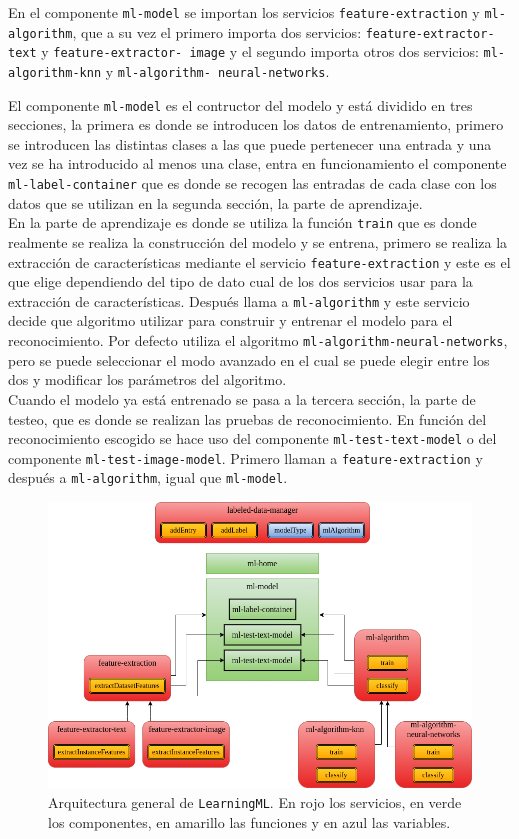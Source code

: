 \documentclass[a4paper, 12pt]{book}
\begin{document}
En el componente \texttt{ml-model} se importan los servicios \texttt{feature-extraction} y \texttt{ml-algorithm}, que a su vez el primero importa dos servicios: \texttt{feature-extractor-text} y \texttt{feature-extractor-
image} y el segundo importa otros dos servicios: \texttt{ml-algorithm-knn} y \texttt{ml-algorithm-
neural-networks}.

El componente \texttt{ml-model} es el contructor del modelo y está dividido en tres secciones, la primera es donde se introducen los datos de entrenamiento, primero se introducen las distintas clases a las que puede pertenecer una entrada y una vez se ha introducido al menos una clase, entra en funcionamiento el componente \texttt{ml-label-container} que es donde se recogen las entradas de cada clase con los datos que se utilizan en la segunda sección, la parte de aprendizaje. \\
En la parte de aprendizaje es donde se utiliza la función \texttt{train} que es donde realmente se realiza la construcción del modelo y se entrena, primero se realiza la extracción de características mediante el servicio \texttt{feature-extraction} y este es el que elige dependiendo del tipo de dato cual de los dos servicios usar para la extracción de características. 
Después llama a \texttt{ml-algorithm} y este servicio decide que algoritmo utilizar para construir y entrenar el modelo para el reconocimiento. 
Por defecto utiliza el algoritmo \texttt{ml-algorithm-neural-networks}, pero se puede seleccionar el modo avanzado en el cual se puede elegir entre los dos y modificar los parámetros del algoritmo.\\
Cuando el modelo ya está entrenado se pasa a la tercera sección, la parte de testeo, que es donde se realizan las pruebas de reconocimiento. 
En función del reconocimiento escogido se hace uso del componente \texttt{ml-test-text-model} o del componente \texttt{ml-test-image-model}. 
Primero llaman a \texttt{feature-extraction} y después a \texttt{ml-algorithm}, igual que \texttt{ml-model}.

\begin{figure}
	\centering
	\includegraphics[width=13cm, keepaspectratio]{img/arquitectura.png}
	\caption{Arquitectura general de \texttt{LearningML}. En rojo los servicios, en verde los componentes, en amarillo las funciones y en azul las variables.} \label{fig:arquitectura}
\end{figure}
\end{document}
